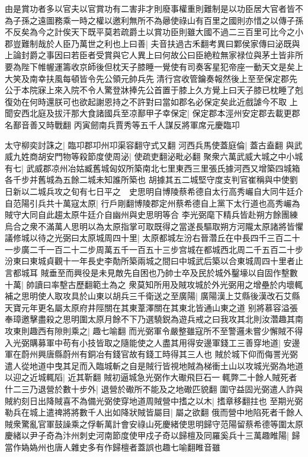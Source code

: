 由是賞功者多以官夫以官賞功有二害非才則廢事權重則難制是以功臣居大官者皆不為子孫之遠圖務乘一時之權以邀利無所不為曏使祿山有百里之國則亦惜之以傳子孫不反矣為今之計俟天下既平莫若疏爵土以賞功臣則雖大國不過二三百里可比今之小郡豈難制哉於人臣乃萬世之利也上曰善|{
	夫音扶過古禾翻考異曰鄴侯家傳曰泌既與上論封爵之事因曰若臣者受賞與它人異上曰何故公曰臣絶粒無家禄位與茅土皆非所要為陛下帷幄運籌收京師後但枕天子膝睡一覺使有司奏客星犯帝座一動天文是矣上大笑及南幸扶風每頓皆令先公領元帥兵先清行宫收管鑰奏報然後上至至保定郡先公于本院寐上來入院不令人驚登牀捧先公首置于膝上久方覺上曰天子膝已枕睡了剋復効在何時還朕可也欲起謝恩持之不許對曰當如郡名必保定矣此近戲謔今不取}
上聞安西北庭及拔汗那大食諸國兵至凉鄯甲子幸保定|{
	保定郡本涇州安定郡去載更郡名鄯音善又時戰翻}
丙寅劒南兵賈秀等五千人謀反將軍席元慶臨卭

太守柳奕討誅之|{
	臨卭郡卭州卭渠容翻守式又翻}
河西兵馬使蓋庭倫|{
	蓋古盍翻}
與武威九姓商胡安門物等殺節度使周泌|{
	使疏吏翻泌毗必翻}
聚衆六萬武威大城之中小城有七|{
	武威郡凉州冶姑臧舊城匈奴所築南北七里東西三里張氏據河西又增築四城箱各千步并舊城為五餘二城未知誰所築也}
胡據其五二城堅守度支判官崔稱與中使劉日新以二城兵攻之旬有七日平之　史思明自博陵蔡希德自太行高秀巗自大同牛廷介自范陽引兵共十萬寇太原|{
	行戶剛翻博陵郡定州蔡希德自上黨下太行道也高秀巗為賊守大同自此趨太原牛廷介自幽州與史思明等合}
李光弼麾下精兵皆赴朔方餘團練烏合之衆不滿萬人思明以為太原指掌可取既得之當遂長驅取朔方河隴太原諸將皆懼議修城以待之光弼曰太原城周四十里|{
	太原都城左汾右晉濳丘在中長四千三百二十一步廣二千一百二十二步周萬五千一百五十三步宫城在都城西北周二千五百二十步汾東曰東城貞觀十一年長史李勣所築兩城之間曰中城武后築以合東城周四十里者止言都城耳}
賊垂至而興役是未見敵先自困也乃帥士卒及民於城外鑿壕以自固作墼數十萬|{
	帥讀曰率墼古歷翻範土為之}
衆莫知所用及賊攻城於外光弼用之增壘於内壞輒補之思明使人取攻具於山東以胡兵三千衛送之至廣陽|{
	廣陽漢上艾縣後漢改石艾縣天寶元年更名屬太原府井陘關在其東葦澤關在其東北皆通山東之道}
别將慕容溢張奉璋邀擊盡殺之思明圍太原月餘不下乃選驍鋭為遊兵戒之曰我攻其北則汝濳趣其南攻東則趣西有隙則乘之|{
	趣七喻翻}
而光弼軍令嚴整雖寇所不至警邏未嘗少懈賊不得入光弼購募軍中苟有小技皆取之隨能使之人盡其用得安邊軍錢工三善穿地道|{
	安邊軍在蔚州興唐縣蔚州有銅冶有錢官故有錢工時得其三人也}
賊於城下仰而侮詈光弼遣人從地道中曳其足而入臨城斬之自是賊行皆視地賊為梯衝土山以攻城光弼為地道以迎之近城輒䧟|{
	近其靳翻}
賊初逼城急光弼作大礮飛巨石一輒弊二十餘人賊死者什二三乃退營於數十步外|{
	退營於礮所不能及之地礮匹貌翻}
圍守益固光弼遣人詐與賊約刻日出降賊喜不為備光弼使穿地道周賊營中搘之以木|{
	搘章移翻拄也}
至期光弼勒兵在城上遣禆將將數千人出如降狀賊皆屬目|{
	屬之欲翻}
俄而營中地陷死者千餘人賊衆驚亂官軍鼓譟乘之俘斬萬計會安祿山死慶緒使思明歸守范陽留蔡希德等圍太原　慶緒以尹子奇為汴州刺史河南節度使甲戍子奇以歸檀及同羅奚兵十三萬趣睢陽|{
	歸當作媯媯州也唐人雜史多有作歸檀者蓋誤也趣七喻翻睢音雖}
